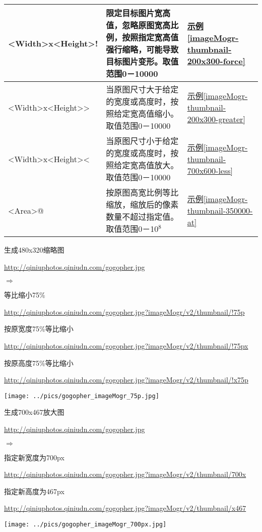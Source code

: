 \documentclass[11pt, oneside]{book}
\newcommand{\qpar}[1]{
\vspace{0.25em}
\noindent
#1\par
\vspace{0.25em}
}
\newcommand{\qurl}[1]{\url{#1}}
\begin{document}
\begin{CJK*}{UTF8}{song}
{\begin{tabular}[t]{|l|p{22em}|p{5em}|}
\hline
\textless Width\textgreater x\textless Height\textgreater ! & 限定目标图片宽高值，忽略原图宽高比例，按照指定宽高值强行缩略，可能导致目标图片变形。取值范围0－10000 & \hyperref[imageMogr-thumbnail-200x300-force]{示例\ref*{imageMogr-thumbnail-200x300-force}} \\
\hline
\textless Width\textgreater x\textless Height\textgreater \textgreater & 当原图尺寸大于给定的宽度或高度时，按照给定宽高值缩小。取值范围0－10000 & \hyperref[imageMogr-thumbnail-200x300-greater]{示例\ref*{imageMogr-thumbnail-200x300-greater}} \\
\hline
\textless Width\textgreater x\textless Height\textgreater \textless & 当原图尺寸小于给定的宽度或高度时，按照给定宽高值放大。取值范围0－10000 &  \hyperref[imageMogr-thumbnail-700x600-less]{示例\ref*{imageMogr-thumbnail-700x600-less}} \\
\hline
\textless Area\textgreater @ & 按原图高宽比例等比缩放，缩放后的像素数量不超过指定值。取值范围0－10$^8$ & \hyperref[imageMogr-thumbnail-350000-at]{示例\ref*{imageMogr-thumbnail-350000-at}} \\
\hline
\end{tabular}
}

\begin{sample}
  \caption{生成480x320缩略图}
    \qpar{\qurl{http://qiniuphotos.qiniudn.com/gogopher.jpg}}
    \qpar{$\Rightarrow$}
    \qpar{等比缩小75\%}
    \qpar{\qurl{http://qiniuphotos.qiniudn.com/gogopher.jpg?imageMogr/v2/thumbnail/!75p}}
    \qpar{按原宽度75\%等比缩小}
    \qpar{\qurl{http://qiniuphotos.qiniudn.com/gogopher.jpg?imageMogr/v2/thumbnail/!75px}}
    \qpar{按原高度75\%等比缩小}
    \qpar{\qurl{http://qiniuphotos.qiniudn.com/gogopher.jpg?imageMogr/v2/thumbnail/!x75p}}

    \begin{center}
      \texttt{[image: ../pics/gogopher\_imageMogr\_75p.jpg]}
    \end{center}
  \label{imageMogr-thumbnail-75p}
\end{sample}

\begin{sample}
  \caption{生成700x467放大图}
    \qpar{\qurl{http://qiniuphotos.qiniudn.com/gogopher.jpg}}
    \qpar{$\Rightarrow$}
    \qpar{指定新宽度为700px}
    \qpar{\qurl{http://qiniuphotos.qiniudn.com/gogopher.jpg?imageMogr/v2/thumbnail/700x}}
    \qpar{指定新高度为467px}
    \qpar{\qurl{http://qiniuphotos.qiniudn.com/gogopher.jpg?imageMogr/v2/thumbnail/x467}}

    \begin{center}
      \texttt{[image: ../pics/gogopher\_imageMogr\_700px.jpg]}
    \end{center}
  \label{imageMogr-thumbnail-700px}
\end{sample}


\end{CJK*}
\end{document}
